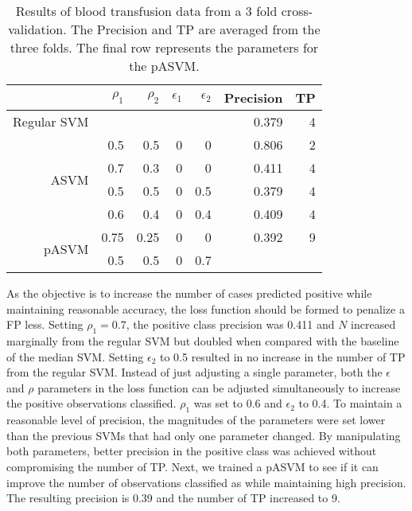 \documentclass[twoside,11pt]{article}
\begin{document}
\begin{table}[htp]
\centering
\begin{tabular}{rrrrr|rr}
\hline
&$\rho_1$ & $\rho_2$ & $\epsilon_1$ & $\epsilon_2$ & Precision & TP \bigstrut\\
\hline
\hline
 Regular SVM &&&&&     0.379 & 4 \bigstrut\\
\hline
\multirow{4}{*}{ASVM} & 0.5   & 0.5   & 0     & 0     & 0.806 & 2 \bigstrut\\
&0.7   & 0.3   & 0     & 0     & 0.411 & 4 \bigstrut\\
&0.5   & 0.5   & 0     & 0.5   & 0.379 & 4 \bigstrut\\
&0.6   & 0.4   & 0     & 0.4   & 0.409 & 4 \bigstrut\\
\hline
\multirow{2}{*}{pASVM} & 0.75  & 0.25  & 0     & 0     & 0.392 & 9 \bigstrut[t]\\
&0.5   & 0.5   & 0     & 0.7   &       &  \bigstrut[b]\\
\hline
\hline
\end{tabular}%
\caption{Results of blood transfusion data from a 3 fold cross-validation. The Precision and TP are averaged from the three folds. The final row represents the parameters for the pASVM.}
\label{bloodtransfusion}
\end{table}

As the objective is to increase the number of cases predicted positive while maintaining reasonable accuracy, the loss function should be formed to penalize a FP less. Setting $\rho_1=0.7$, the positive class precision was 0.411 and $N$ increased marginally from the regular SVM but doubled when compared with the baseline of the median SVM. Setting $\epsilon_2$ to 0.5 resulted in no increase in the number of TP from the regular SVM. Instead of just adjusting a single parameter, both the $\epsilon$ and $\rho$ parameters in the loss function can be adjusted simultaneously to increase the positive observations classified. $\rho_1$ was set to 0.6 and $\epsilon_2$ to 0.4. To maintain a reasonable level of precision, the magnitudes of the parameters were set lower than the previous SVMs that had only one parameter changed. By manipulating both parameters, better precision in the positive class was achieved without compromising the number of TP. Next, we trained a pASVM to see if it can improve the number of observations classified as while maintaining high precision. The resulting precision is 0.39 and the number of TP increased to 9.
\end{document}

